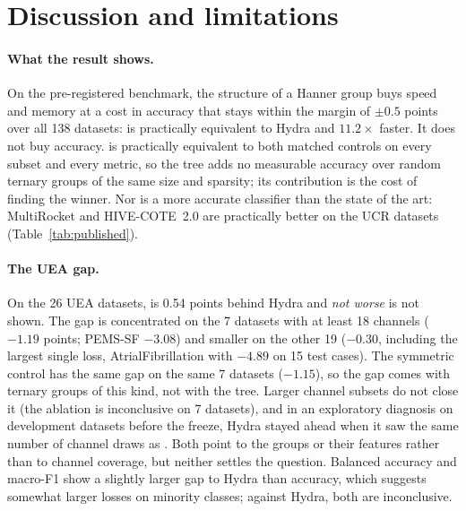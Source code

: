 \section{Discussion and limitations}
\label{sec:discussion}

\paragraph{What the result shows.} On the pre-registered benchmark, the structure of a
Hanner group buys speed and memory at a cost in accuracy that stays within the margin of
$\pm0.5$ points over all 138 datasets: \hh{} is practically equivalent to Hydra and
$11.2\times$ faster. It
does not buy accuracy. \hh{} is practically equivalent to both matched controls on every
subset and every metric, so the tree adds no measurable accuracy over random ternary
groups of the same size and sparsity; its contribution is the cost of finding the winner. Nor is \hh{} a more accurate classifier than the state of the art: MultiRocket and
HIVE-COTE~2.0 are practically better on the UCR datasets (Table~\ref{tab:published}).

\paragraph{The UEA gap.} On the 26 UEA datasets, \hh{} is 0.54 points behind Hydra and
\emph{not worse} is not shown. The gap is concentrated on the 7 datasets with at least 18
channels ($-1.19$ points; PEMS-SF $-3.08$) and smaller on the other 19 ($-0.30$, including
the largest single loss, AtrialFibrillation with $-4.89$ on 15 test cases). The symmetric
control has the same gap on the same 7 datasets ($-1.15$), so the gap comes with ternary
groups of this kind, not with the tree. Larger channel subsets do not close it (the ablation
is inconclusive on 7 datasets), and in an exploratory diagnosis on development datasets
before the freeze, Hydra stayed ahead when it saw the same number of channel draws as
\hh{}. Both point to the groups or their features rather than to channel coverage, but
neither settles the question. Balanced accuracy and macro-F1 show a slightly larger gap to
Hydra than accuracy, which suggests somewhat larger losses on minority classes; against
Hydra, both are inconclusive.

